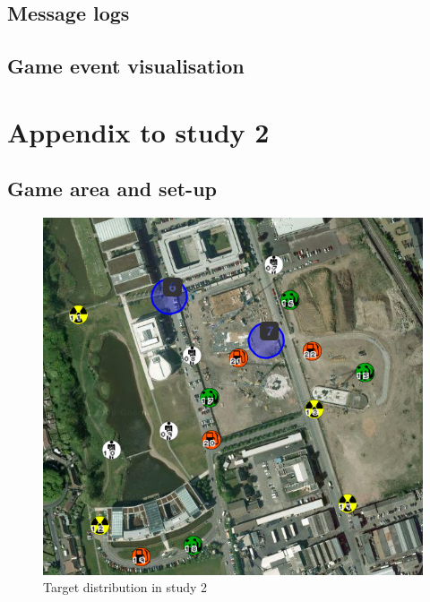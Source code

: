 \section{Message logs}

\section{Game event visualisation}



\chapter{Appendix to study 2}



\section{Game area and set-up}
\begin{figure}[H]
  \centering
  \includegraphics[width=1\textwidth]{img/Appendix/targets1}
  \caption{Target distribution in study 2}
\end{figure}

